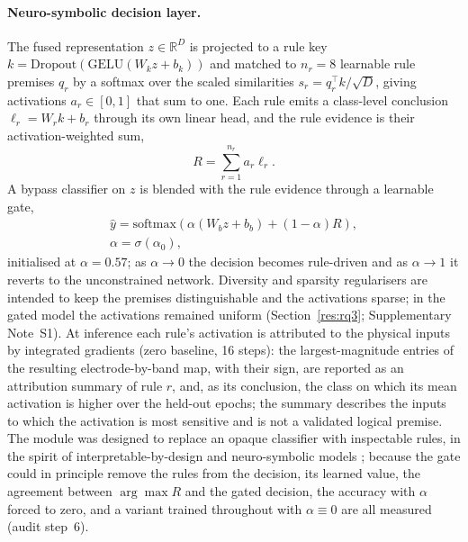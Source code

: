 \documentclass[pdflatex,sn-basic,Numbered,twocolumn,iicol]{sn-jnl}
\theoremstyle{thmstyleone}%
\theoremstyle{thmstyletwo}%
\theoremstyle{thmstylethree}%
\begin{document}
\paragraph{Neuro-symbolic decision layer.} The fused representation $z\in\mathbb{R}^D$ is projected to a rule key $k=\mathrm{Dropout}(\mathrm{GELU}(W_k z + b_k))$ and matched to $n_r=8$ learnable rule premises $q_r$ by a softmax over the scaled similarities $s_r=q_r^{\top}k/\sqrt{D}$, giving activations $a_r\in[0,1]$ that sum to one. Each rule emits a class-level conclusion $\ell_r=W_r k+b_r$ through its own linear head, and the rule evidence is their activation-weighted sum,
\begin{equation}
R = \sum_{r=1}^{n_r} a_r \ell_r . \label{eq17}
\end{equation}
A bypass classifier on $z$ is blended with the rule evidence through a learnable gate,
\begin{equation}
\begin{gathered}
\hat y = \mathrm{softmax}\!\left(\alpha(W_b z + b_b) + (1-\alpha) R\right),\\
\alpha=\sigma(\alpha_0),
\end{gathered} \label{eq18}
\end{equation}
initialised at $\alpha=0.57$; as $\alpha\to0$ the decision becomes rule-driven and as $\alpha\to1$ it reverts to the unconstrained network. Diversity and sparsity regularisers are intended to keep the premises distinguishable and the activations sparse; in the gated model the activations remained uniform (Section~\ref{res:rq3}; Supplementary Note~S1). At inference each rule's activation is attributed to the physical inputs by integrated gradients \cite{ref54} (zero baseline, 16 steps): the largest-magnitude entries of the resulting electrode-by-band map, with their sign, are reported as an attribution summary of rule $r$, and, as its conclusion, the class on which its mean activation is higher over the held-out epochs; the summary describes the inputs to which the activation is most sensitive and is not a validated logical premise. The module was designed to replace an opaque classifier with inspectable rules, in the spirit of interpretable-by-design and neuro-symbolic models \cite{ref45,ref46,ref47}; because the gate could in principle remove the rules from the decision, its learned value, the agreement between $\arg\max R$ and the gated decision, the accuracy with $\alpha$ forced to zero, and a variant trained throughout with $\alpha\equiv0$ are all measured (audit step~6).
\end{document}
